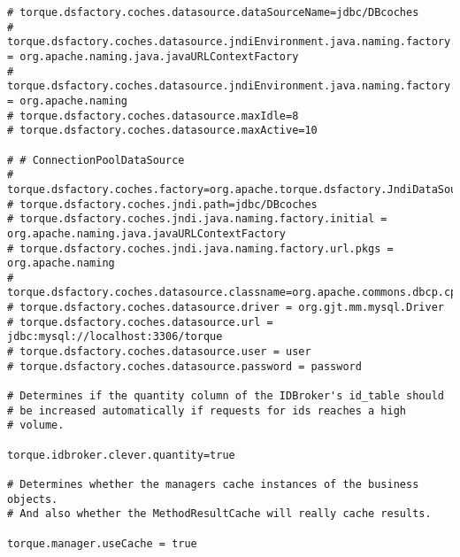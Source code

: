 \begin{lstlisting}
# torque.dsfactory.coches.datasource.dataSourceName=jdbc/DBcoches
# torque.dsfactory.coches.datasource.jndiEnvironment.java.naming.factory.initial = org.apache.naming.java.javaURLContextFactory
# torque.dsfactory.coches.datasource.jndiEnvironment.java.naming.factory.url.pkgs = org.apache.naming
# torque.dsfactory.coches.datasource.maxIdle=8
# torque.dsfactory.coches.datasource.maxActive=10

# # ConnectionPoolDataSource
# torque.dsfactory.coches.factory=org.apache.torque.dsfactory.JndiDataSourceFactory
# torque.dsfactory.coches.jndi.path=jdbc/DBcoches
# torque.dsfactory.coches.jndi.java.naming.factory.initial = org.apache.naming.java.javaURLContextFactory
# torque.dsfactory.coches.jndi.java.naming.factory.url.pkgs = org.apache.naming
# torque.dsfactory.coches.datasource.classname=org.apache.commons.dbcp.cpdsadapter.DriverAdapterCPDS
# torque.dsfactory.coches.datasource.driver = org.gjt.mm.mysql.Driver
# torque.dsfactory.coches.datasource.url = jdbc:mysql://localhost:3306/torque
# torque.dsfactory.coches.datasource.user = user
# torque.dsfactory.coches.datasource.password = password

# Determines if the quantity column of the IDBroker's id_table should
# be increased automatically if requests for ids reaches a high
# volume.

torque.idbroker.clever.quantity=true

# Determines whether the managers cache instances of the business objects.
# And also whether the MethodResultCache will really cache results.

torque.manager.useCache = true
\end{lstlisting}